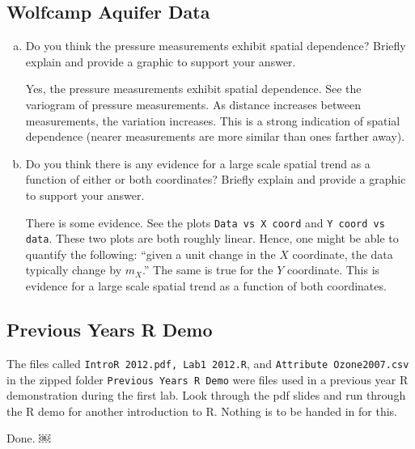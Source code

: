 \documentclass[letterpaper, 12pt]{article}
\begin{document}
\subsection*{Wolfcamp Aquifer Data}
\begin{enumerate}[e.]
\item
Do you think the pressure measurements exhibit spatial dependence? Briefly explain and provide a graphic to support your answer.

\textsf{
Yes, the pressure measurements exhibit spatial dependence. See the variogram of pressure measurements. As distance increases between measurements, the variation increases. This is a strong indication of spatial dependence (nearer measurements are more similar than ones farther away).
}

\item
Do you think there is any evidence for a large scale spatial trend as a function of either or both coordinates? Briefly explain and provide a graphic to support your answer.

\textsf{
There is some evidence. See the plots \texttt{Data vs X coord} and \texttt{Y coord vs data}. These two plots are both roughly linear. Hence, one might be able to quantify the following: ``given a unit change in the $X$ coordinate, the data typically change by $m_X$.'' The same is true for the $Y$ coordinate. This is evidence for a large scale spatial trend as a function of both coordinates.
}
\end{enumerate}
\subsection*{Previous Years R Demo}
The files called \texttt{IntroR 2012.pdf, Lab1 2012.R}, and \texttt{Attribute Ozone2007.csv} in the zipped folder \texttt{Previous Years R Demo} were files used in a previous year R demonstration during the first lab. Look through the pdf slides and run through the R demo for another introduction to R. Nothing is to be handed in for this.

\textsf{Done.}
￼
\end{document}
